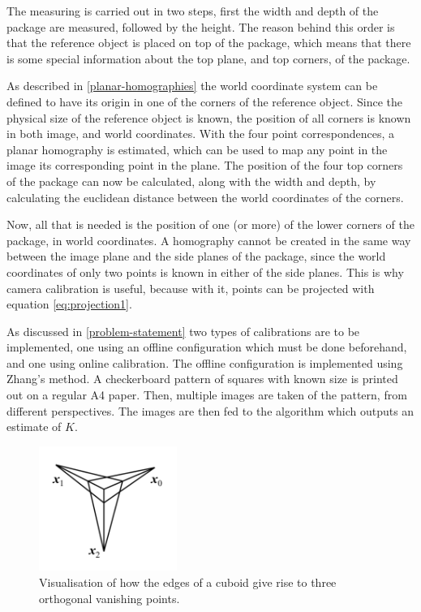 The measuring is carried out in two steps, first the width and depth of the package are measured, followed by the height. 
The reason behind this order is that the reference object is placed on top of the package, which means that there is some special information about the top plane, and top corners, of the package.

As described in \ref{planar-homographies} the world coordinate system can be defined to have its origin in one of the corners of the reference object.
Since the physical size of the reference object is known, the position of all corners is known in both image, and world coordinates.
With the four point correspondences, a planar homography is estimated, which can be used to map any point in the image its corresponding point in the plane.
The position of the four top corners of the package can now be calculated, along with the width and depth, by calculating the euclidean distance between the world coordinates of the corners.

Now, all that is needed is the position of one (or more) of the lower corners of the package, in world coordinates.
A homography cannot be created in the same way between the image plane and the side planes of the package, since the world coordinates of only two points is known in either of the side planes.
This is why camera calibration is useful, because with it, points can be projected with equation \ref{eq:projection1}.


As discussed in \ref{problem-statement} two types of calibrations are to be implemented, one using an offline configuration which must be done beforehand, and one using online calibration.
The offline configuration is implemented using Zhang's method.
A checkerboard pattern of squares with known size is printed out on a regular A4 paper.
Then, multiple images are taken of the pattern, from different perspectives. 
The images are then fed to the algorithm which outputs an estimate of $K$.%

\begin{figure}
\begin{center}
\includegraphics[width=0.4\textwidth]{figures/vanishing_points.png}
\end{center}
\caption{Visualisation of how the edges of a cuboid give rise to three orthogonal vanishing points.} %
\label{fig:vanishing_points} %
\end{figure}

